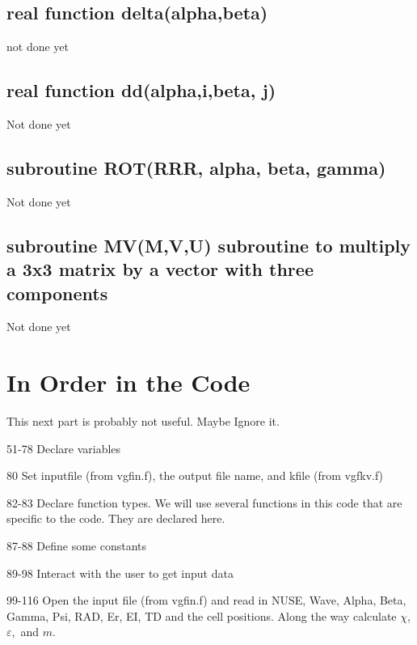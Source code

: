 \documentclass{article}
\begin{document}
\subsection{real function delta(alpha,beta)}

not done yet

\subsection{real function dd(alpha,i,beta, j) }

Not done yet

\subsection{subroutine ROT(RRR, alpha, beta, gamma)}

Not done yet

\subsection{subroutine MV(M,V,U) subroutine to multiply a 3x3 matrix by a
vector with three components}

Not done yet

\section{In Order in the Code}

This next part is probably not useful. Maybe Ignore it.

51-78 Declare variables

80 Set inputfile (from vgfin.f), the output file name, and kfile (from
vgfkv.f)

82-83 Declare function types. We will use several functions in this code
that are specific to the code. They are declared here.

87-88 Define some constants

89-98 Interact with the user to get input data

99-116 Open the input file (from vgfin.f) and read in NUSE, Wave, Alpha,
Beta, Gamma, Psi, RAD, Er, EI, TD and the cell positions. Along the way
calculate $\chi $, $\varepsilon ,$ and $m.$
\end{document}
